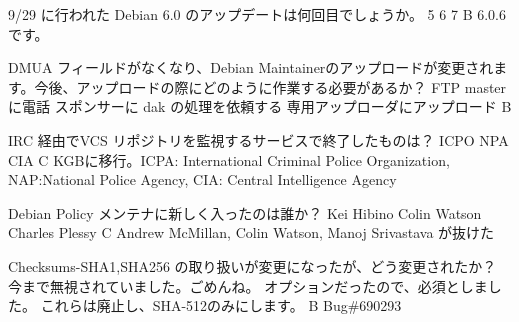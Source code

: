 %

\santaku
{9/29 に行われた Debian 6.0 のアップデートは何回目でしょうか。}
{5}
{6}
{7}
{B}
{6.0.6 です。}

\santaku
{DMUA フィールドがなくなり、Debian Maintainerのアップロードが変更されます。今後、アップロードの際にどのように作業する必要があるか？}
{FTP masterに電話}
{スポンサーに dak の処理を依頼する}
{専用アップローダにアップロード}
{B}
{}

\santaku
{IRC 経由でVCS リポジトリを監視するサービスで終了したものは？}
{ICPO}
{NPA}
{CIA}
{C}
{KGBに移行。ICPA:  International Criminal Police Organization, NAP:National Police Agency, CIA: Central Intelligence Agency}

\santaku
{Debian Policy メンテナに新しく入ったのは誰か？}
{Kei Hibino}
{Colin Watson}
{Charles Plessy}
{C}
{Andrew McMillan, Colin Watson, Manoj Srivastava が抜けた}

\santaku
{Checksums-SHA1,SHA256 の取り扱いが変更になったが、どう変更されたか？}
{今まで無視されていました。ごめんね。}
{オプションだったので、必須としました。}
{これらは廃止し、SHA-512のみにします。}
{B}
{Bug\#690293}
